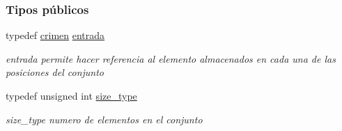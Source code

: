 \subsubsection*{Tipos públicos}
\begin{DoxyCompactItemize}
\item 
typedef \hyperlink{classcrimen}{crimen} \hyperlink{classconjunto_a09cad766dd65de73e51eae21f9d22585}{entrada}
\begin{DoxyCompactList}\small\item\em entrada permite hacer referencia al elemento almacenados en cada una de las posiciones del conjunto \end{DoxyCompactList}\item 
typedef unsigned int \hyperlink{classconjunto_a855a5893bb0f5a851ab2dbf2b8aa6cc7}{size\+\_\+type}
\begin{DoxyCompactList}\small\item\em size\+\_\+type numero de elementos en el conjunto \end{DoxyCompactList}\end{DoxyCompactItemize}
